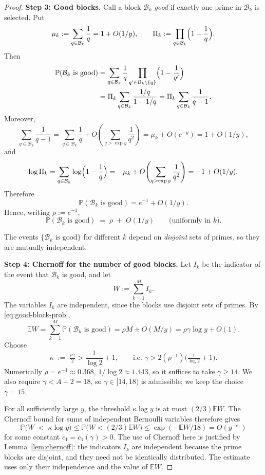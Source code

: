 \documentclass[11pt,reqno]{amsart}
\theoremstyle{plain}
\theoremstyle{definition}
\newcommand{\PP}{\mathbb{P}}
\newcommand{\EE}{\mathbb{E}}
\begin{document}
\begin{proof}
\medskip\noindent
\textbf{Step 3: Good blocks.} Call a block $\mathcal{B}_k$ \emph{good} if exactly
one prime in $\mathcal{B}_k$ is selected. Put
\[
\mu_k:=\sum_{q\in\mathcal B_k}\frac1q=1+O(1/y),
\qquad
\Pi_k:=\prod_{q\in\mathcal B_k}\Bigl(1-\frac1q\Bigr).
\]
Then
\begin{align*}
\PP(\mathcal B_k\text{ is good})
&=
\sum_{q\in\mathcal B_k}
\frac1q\prod_{q'\in\mathcal B_k\setminus\{q\}}
\Bigl(1-\frac1{q'}\Bigr)  \\
&=
\Pi_k\sum_{q\in\mathcal B_k}\frac{1/q}{1-1/q}
=
\Pi_k\sum_{q\in\mathcal B_k}\frac1{q-1}.
\end{align*}
Moreover,
\[
\sum_{q\in\mathcal B_k}\frac1{q-1}
=
\sum_{q\in\mathcal B_k}\frac1q
+
O\!\left(\sum_{q>\exp y}\frac1{q^2}\right)
=
\mu_k+O(e^{-y})
=
1+O(1/y),
\]
and
\[
\log \Pi_k
=
\sum_{q\in\mathcal B_k}\log\Bigl(1-\frac1q\Bigr)
=
-\mu_k+O\!\left(\sum_{q>\exp y}\frac1{q^2}\right)
=
-1+O(1/y).
\]
Therefore
\[
\PP(\mathcal B_k\text{ is good})=e^{-1}+O(1/y).
\]
Hence, writing $\rho:=e^{-1}$,
\begin{equation}\label{eq:good-block-prob}
\PP(\mathcal{B}_k\text{ is good}) \;=\; \rho \;+\; O(1/y)
\qquad\text{(uniformly in $k$).}
\end{equation}

The events $\{\mathcal{B}_k\text{ is good}\}$ for different $k$ depend on
\emph{disjoint} sets of primes, so they are mutually independent.

\medskip\noindent
\textbf{Step 4: Chernoff for the number of good blocks.} Let
$I_k$ be the indicator of the event that $\mathcal B_k$ is good, and let
\[
W:=\sum_{k=1}^M I_k.
\]
The variables $I_k$ are independent, since the blocks use disjoint sets of
primes. By \eqref{eq:good-block-prob},
\[
\EE W
=
\sum_{k=1}^M \PP(\mathcal B_k\text{ is good})
=
\rho M+O(M/y)
=
\rho\gamma\log y+O(1).
\]
Choose
\begin{equation}\label{eq:gamma-choice}
\kappa \;:=\; \tfrac{\rho\gamma}{2}>\frac{1}{\log 2}+1,
\qquad
\text{i.e.\ } \gamma > 2(\rho^{-1})\!\bigl(\tfrac{1}{\log 2}+1\bigr).
\end{equation}
Numerically $\rho=e^{-1}\approx 0.368$, $1/\log 2\approx 1.443$, so it suffices
to take $\gamma\ge 14$. We also require $\gamma<A-2=18$, so
$\gamma\in[14,18)$ is admissible; we keep the choice $\gamma=15$.

For all sufficiently large $y$, the threshold $\kappa\log y$ is at most
$(2/3)\EE W$. The Chernoff bound for sums of independent Bernoulli variables
therefore gives
\begin{equation}\label{eq:lots-good-blocks}
\PP\bigl(W\;<\;\kappa\log y\bigr)
\le
\PP\bigl(W<(2/3)\EE W\bigr)
\le
\exp(-\EE W/18)
=
O(y^{-c_1})
\end{equation}
for some constant $c_1=c_1(\gamma)>0$.
The use of Chernoff here is justified by Lemma~\ref{lem:chernoff}: the
indicators $I_k$ are independent because the prime blocks are disjoint, and
they need not be identically distributed. The estimate uses only their
independence and the value of $\EE W$.


\end{proof}
\end{document}
